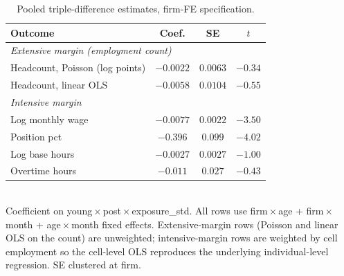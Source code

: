 \begin{table}[htbp]
  \centering
  \caption{Pooled triple-difference estimates, firm-FE specification.}
  \label{tab:firmfe_alt}
  \begin{tabular}{lccc}
  \toprule
  Outcome & Coef. & SE & $t$ \\
  \midrule
  \multicolumn{4}{l}{\textit{Extensive margin (employment count)}} \\
  Headcount, Poisson (log points)        & $-0.0022$ & $0.0063$ & $-0.34$ \\
  Headcount, linear OLS                  & $-0.0058$ & $0.0104$ & $-0.55$ \\
  \midrule
  \multicolumn{4}{l}{\textit{Intensive margin}} \\
  Log monthly wage                       & $-0.0077$ & $0.0022$ & $-3.50$ \\
  Position pct                           & $-0.396$  & $0.099$  & $-4.02$ \\
  Log base hours                         & $-0.0027$ & $0.0027$ & $-1.00$ \\
  Overtime hours                         & $-0.011$  & $0.027$  & $-0.43$ \\
  \bottomrule
  \end{tabular}
  \\[3pt]
  \footnotesize Coefficient on young\,$\times$\,post\,$\times$\,exposure\_std. All rows use firm\,$\times$\,age + firm\,$\times$\,month + age\,$\times$\,month fixed effects. Extensive-margin rows (Poisson and linear OLS on the count) are unweighted; intensive-margin rows are weighted by cell employment so the cell-level OLS reproduces the underlying individual-level regression. SE clustered at firm.
\end{table}
